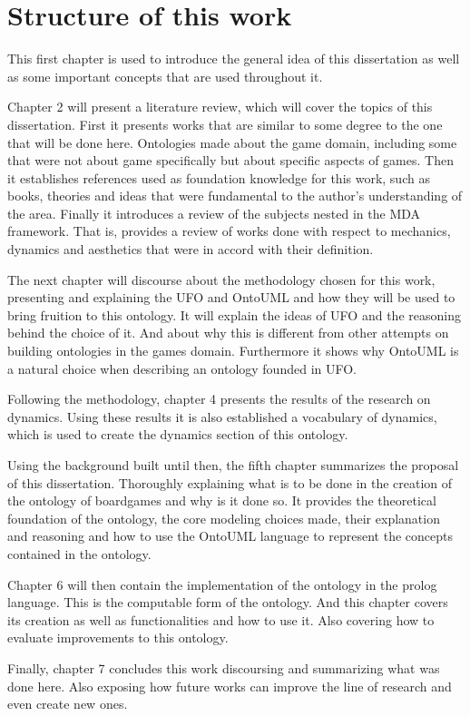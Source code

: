 \section{Structure of this work}

This first chapter is used to introduce the general idea of this dissertation as well as some important concepts that are used throughout it.

Chapter 2 will present a literature review, which will cover the topics of this dissertation. First it presents works that are similar to some degree to the one that will be done here. Ontologies made about the game domain, including some that were not about game specifically but about specific aspects of games. Then it establishes references used as foundation knowledge for this work, such as books, theories and ideas that were fundamental to the author's understanding of the area. Finally it introduces a review of the subjects nested in the MDA framework. That is, provides a review of works done with respect to mechanics, dynamics and aesthetics that were in accord with their definition.

The next chapter will discourse about the methodology chosen for this work, presenting and explaining the UFO and OntoUML and how they will be used to bring fruition to this ontology. It will explain the ideas of UFO and the reasoning behind the choice of it. And about why this is different from other attempts on building ontologies in the games domain. Furthermore it shows why OntoUML is a natural choice when describing an ontology founded in UFO. 

Following the methodology, chapter 4 presents the results of the research on dynamics. Using these results it is also established a vocabulary of dynamics, which is used to create the dynamics section of this ontology.

Using the background built until then, the fifth chapter summarizes the proposal of this dissertation. Thoroughly explaining what is to be done in the creation of the ontology of boardgames and why is it done so. It provides the theoretical foundation of the ontology, the core modeling choices made, their explanation and reasoning and how to use the OntoUML language to represent the concepts contained in the ontology.

Chapter 6 will then contain the implementation of the ontology in the prolog language. This is the computable form of the ontology. And this chapter covers its creation as well as functionalities and how to use it. Also covering how to evaluate improvements to this ontology.

Finally, chapter 7 concludes this work discoursing and summarizing what was done here. Also exposing how future works can improve the line of research and even create new ones.

